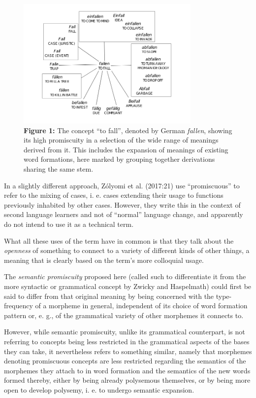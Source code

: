 \documentclass[
  a4paper,
  14pt,
  oneside,
  tablecaptionabove
]{scrbook}
\begin{document}
\begin{figure}[htb]
\centering
\includegraphics[width=0.8\textwidth]{images/fallen.png}
\caption*{\small \textbf{Figure 1:} The concept \enquote{to fall}, denoted by German
\emph{fallen}, showing its high promiscuity in a selection of the wide
range of meanings derived from it. This includes the expansion of
meanings of existing word formations, here marked by grouping together
derivations sharing the same stem. }
\end{figure}


In a slightly different approach, Zólyomi et al. (2017:21) use
\enquote{promiscuous} to refer to the mixing of cases, i. e. cases
extending their usage to functions previously inhabited by other cases.
However, they write this in the context of second language learners and
not of \enquote{normal} language change, and apparently do not intend to
use it as a technical term.

What all these uses of the term have in common is that they talk about
the \emph{openness} of something to connect to a variety of different
kinds of other things, a meaning that is clearly based on the term's
more colloquial usage.

The \emph{semantic promiscuity} proposed here (called such to
differentiate it from the more syntactic or grammatical concept by
Zwicky and Haspelmath) could first be said to differ from that original
meaning by being concerned with the type-frequency of a morpheme in
general, independent of its choice of word formation pattern or, e. g.,
of the grammatical variety of other morphemes it connects to.

However, while semantic promiscuity, unlike its grammatical counterpart,
is not referring to concepts being less restricted in the grammatical
aspects of the bases they can take, it nevertheless refers to something
similar, namely that morphemes denoting promiscuous concepts are less
restricted regarding the semantics of the morphemes they attach to in
word formation and the semantics of the new words formed thereby, either
by being already polysemous themselves, or by being more open to develop
polysemy, i. e. to undergo semantic expansion.
\end{document}
